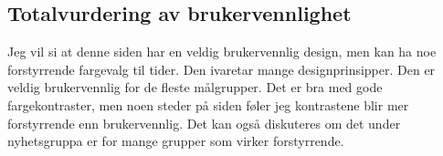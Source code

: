 \subsection{Totalvurdering av brukervennlighet}

Jeg vil si at denne siden har en veldig brukervennlig design, men kan ha noe forstyrrende fargevalg til tider. Den ivaretar mange designprinsipper.  Den er veldig brukervennlig for de fleste målgrupper. Det er bra med gode fargekontraster, men noen steder på siden føler jeg kontrastene blir mer forstyrrende enn brukervennlig. Det kan også diskuteres om det under nyhetsgruppa er for mange grupper som virker forstyrrende. 